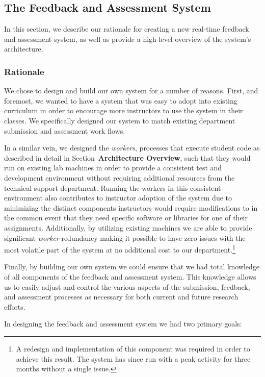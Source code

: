 \subsection{The Feedback and Assessment System}

In this section, we describe our rationale for creating a new real-time
feedback and assessment system, as well as provide a high-level overview of the
system's architecture.

\subsubsection{Rationale}
We chose to design and build our own system for a number of reasons. First, and
foremost, we wanted to have a system that was easy to adopt into existing
curriculum in order to encourage more instructors to use the system in their
classes. We specifically designed our system to match existing department
submission and assessment work flows.

In a similar vein, we designed the \emph{workers}, processes that execute
student code as described in detail in Section~\textbf{Architecture Overview},
such that they would run on existing lab machines in order to provide a
consistent test and development environment without requiring additional
resources from the technical support department. Running the workers in this
consistent environment also contributes to instructor adoption of the system
due to minimizing the distinct components instructors would require
modifications to in the common event that they need specific software or
libraries for one of their assignments. Additionally, by utilizing existing
machines we are able to provide significant \emph{worker} redundancy making it
possible to have zero issues with the most volatile part of the system at no
additional cost to our department.\footnote{A redesign and implementation of
  this component was required in order to achieve this result. The system has
  since run with a peak activity for three months without a single issue.}

Finally, by building our own system we could ensure that we had total knowledge
of all components of the feedback and assessment system. This knowledge allows
us to easily adjust and control the various aspects of the submission,
feedback, and assessment processes as necessary for both current and future
research efforts.

In designing the feedback and assessment system we had two primary goals:


